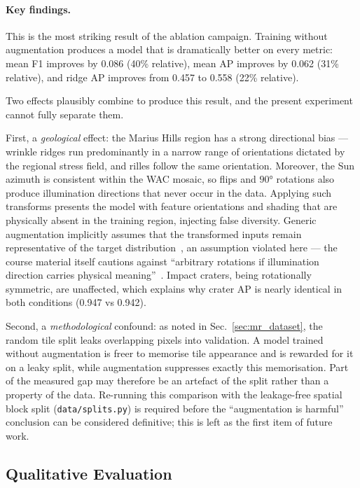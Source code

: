 \paragraph{Key findings.}
This is the most striking result of the ablation campaign. Training without augmentation produces a model that is dramatically better on every metric: mean F1 improves by 0.086 (40\% relative), mean AP improves by 0.062 (31\% relative), and ridge AP improves from 0.457 to 0.558 (22\% relative).

Two effects plausibly combine to produce this result, and the present experiment cannot fully separate them.

First, a \emph{geological} effect: the Marius Hills region has a strong directional bias — wrinkle ridges run predominantly in a narrow range of orientations dictated by the regional stress field, and rilles follow the same orientation. Moreover, the Sun azimuth is consistent within the WAC mosaic, so flips and $90°$ rotations also produce illumination directions that never occur in the data. Applying such transforms presents the model with feature orientations and shading that are physically absent in the training region, injecting false diversity. Generic augmentation implicitly assumes that the transformed inputs remain representative of the target distribution~\cite{shorten2019augmentation}, an assumption violated here — the course material itself cautions against ``arbitrary rotations if illumination direction carries physical meaning''~\cite{zingales2026lecture}. Impact craters, being rotationally symmetric, are unaffected, which explains why crater AP is nearly identical in both conditions (0.947 vs 0.942).

Second, a \emph{methodological} confound: as noted in Sec.~\ref{sec:mr_dataset}, the random tile split leaks overlapping pixels into validation. A model trained without augmentation is freer to memorise tile appearance and is rewarded for it on a leaky split, while augmentation suppresses exactly this memorisation. Part of the measured gap may therefore be an artefact of the split rather than a property of the data. Re-running this comparison with the leakage-free spatial block split (\texttt{data/splits.py}) is required before the ``augmentation is harmful'' conclusion can be considered definitive; this is left as the first item of future work.

\subsection{Qualitative Evaluation}
\label{sec:mr_qualitative}

